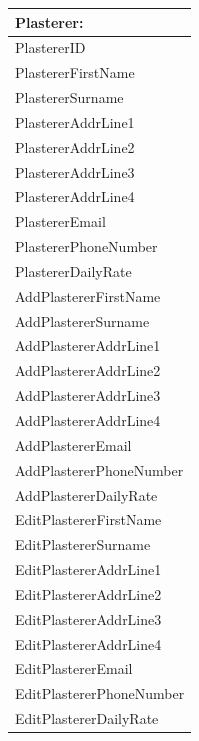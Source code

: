 \begin{tabular}{|p{5cm}|}
	\hline
	\textbf{Plasterer:} \\ \hline
		PlastererID \\
		PlastererFirstName \\
		PlastererSurname \\
		PlastererAddrLine1 \\
		PlastererAddrLine2 \\
		PlastererAddrLine3 \\
		PlastererAddrLine4 \\
		PlastererEmail \\
		PlastererPhoneNumber \\
		PlastererDailyRate \\ \hline
		AddPlastererFirstName \\
		AddPlastererSurname \\
		AddPlastererAddrLine1 \\
		AddPlastererAddrLine2 \\
		AddPlastererAddrLine3 \\
		AddPlastererAddrLine4 \\
		AddPlastererEmail \\
		AddPlastererPhoneNumber \\
		AddPlastererDailyRate \\
 		
		EditPlastererFirstName \\
		EditPlastererSurname \\
		EditPlastererAddrLine1 \\
		EditPlastererAddrLine2 \\
		EditPlastererAddrLine3 \\
		EditPlastererAddrLine4 \\
		EditPlastererEmail \\
		EditPlastererPhoneNumber \\
		EditPlastererDailyRate \\ \hline
\end{tabular}

